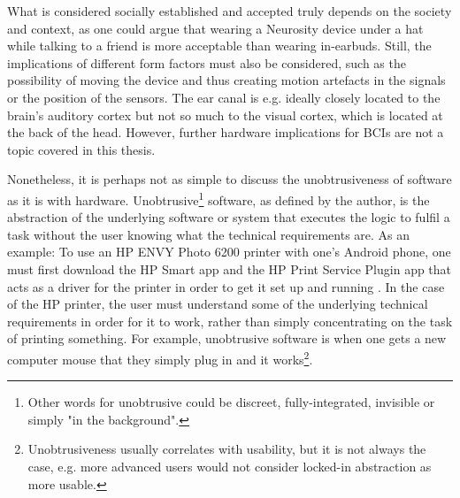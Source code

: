 What is considered socially established and accepted truly depends on the society and context, as one could argue that wearing a Neurosity device under a hat while talking to a friend is more acceptable than wearing in-earbuds. Still, the implications of different form factors must also be considered, such as the possibility of moving the device and thus creating motion artefacts in the signals or the position of the sensors. The ear canal is e.g. ideally closely located to the brain's auditory cortex but not so much to the visual cortex, which is located at the back of the head. However, further hardware implications for BCIs are not a topic covered in this thesis.

Nonetheless, it is perhaps not as simple to discuss the unobtrusiveness of software as it is with hardware. Unobtrusive\footnote{Other words for unobtrusive could be discreet, fully-integrated, invisible or simply "in the background".} software, as defined by the author, is the abstraction of the underlying software or system that executes the logic to fulfil a task without the user knowing what the technical requirements are. As an example: To use an HP ENVY Photo 6200 printer with one's Android phone, one must first download the HP Smart app and the HP Print Service Plugin app that acts as a driver for the printer in order to get it set up and running \citep{hp_hp_nodate}. In the case of the HP printer, the user must understand some of the underlying technical requirements in order for it to work, rather than simply concentrating on the task of printing something. For example, unobtrusive software is when one gets a new computer mouse that they simply plug in and it works\footnote{Unobtrusiveness usually correlates with usability, but it is not always the case, e.g. more advanced users would not consider locked-in abstraction as more usable.}.

